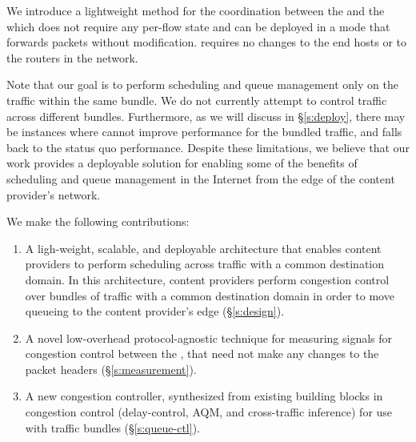 We introduce a lightweight method for the coordination between the \inbox and the \outbox which does not require any per-flow state and can be deployed in a mode that forwards packets without modification. \name requires no changes to the end hosts or to the routers in the network.
 
Note that our goal is to perform scheduling and queue management only on the traffic within the same bundle. We do not currently attempt to control traffic across different bundles. 
Furthermore, as we will discuss in \S\ref{s:deploy}, there may be instances where \name cannot improve performance for the bundled traffic, and falls back to the status quo performance. 
Despite these limitations, we believe that our work provides a deployable solution for enabling some of the benefits of scheduling and queue management in the Internet from the edge of the content provider's network.
 
We make the following contributions:
\begin{enumerate}
    \item A ligh-weight, scalable, and deployable architecture that enables content providers to perform scheduling across traffic with a common destination domain. In this architecture, content providers perform congestion control over bundles of traffic with a common destination domain in order to move queueing to the content provider's edge (\S\ref{s:design}).
     \item A novel low-overhead protocol-agnostic technique for measuring signals for congestion control between the \pair, that need not make any changes to the packet headers (\S\ref{s:measurement}).
     \item A new congestion controller, synthesized from existing building blocks in congestion control (delay-control, AQM, and cross-traffic inference) for use with traffic bundles (\S\ref{s:queue-ctl}).
\end{enumerate}
